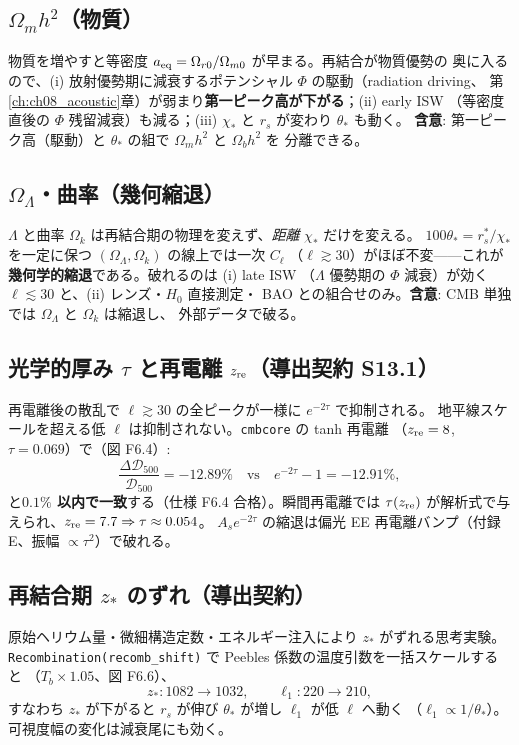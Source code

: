 \subsection{$\Omega_mh^2$（物質）}
物質を増やすと等密度 $a_{\rm eq}=\Omega_{r0}/\Omega_{m0}$ が早まる。再結合が物質優勢の
奥に入るので、(i) 放射優勢期に減衰するポテンシャル $\Phi$ の駆動（radiation driving、
第\ref{ch:ch08_acoustic}章）が弱まり\textbf{第一ピーク高が下がる}；(ii) early ISW
（等密度直後の $\Phi$ 残留減衰）も減る；(iii) $\chi_*$ と $r_s$ が変わり $\theta_*$ も動く。
\textbf{含意}: 第一ピーク高（駆動）と $\theta_*$ の組で $\Omega_mh^2$ と $\Omega_bh^2$ を
分離できる。

\subsection{$\Omega_\Lambda$・曲率（幾何縮退）}
$\Lambda$ と曲率 $\Omega_k$ は再結合期の物理を変えず、\emph{距離} $\chi_*$ だけを変える。
$100\theta_*=r_s^*/\chi_*$ を一定に保つ $(\Omega_\Lambda,\Omega_k)$ の線上では一次 $C_\ell$
（$\ell\gtrsim30$）がほぼ不変——これが\textbf{幾何学的縮退}である。破れるのは (i) late ISW
（$\Lambda$ 優勢期の $\Phi$ 減衰）が効く $\ell\lesssim30$ と、(ii) レンズ・$H_0$ 直接測定・
BAO との組合せのみ。\textbf{含意}: CMB 単独では $\Omega_\Lambda$ と $\Omega_k$ は縮退し、
外部データで破る。

\subsection{光学的厚み $\tau$ と再電離 $z_{\rm re}$（導出契約 S13.1）}
再電離後の散乱で $\ell\gtrsim30$ の全ピークが一様に $e^{-2\tau}$ で抑制される。
地平線スケールを超える低 $\ell$ は抑制されない。\texttt{cmbcore} の tanh 再電離
（$z_{\rm re}=8$, $\tau=0.069$）で（図 F6.4）:
\begin{equation}
  \frac{\Delta\mathcal D_{500}}{\mathcal D_{500}}=-12.89\%
  \quad\text{vs}\quad e^{-2\tau}-1=-12.91\%,
\end{equation}
と\textbf{$0.1\%$ 以内で一致}する（仕様 F6.4 合格）。瞬間再電離では
$\tau(z_{\rm re})$ が解析式で与えられ、$z_{\rm re}=7.7\Rightarrow\tau\approx0.054$。
$A_se^{-2\tau}$ の縮退は偏光 EE 再電離バンプ（付録E、振幅 $\propto\tau^2$）で破れる。

\subsection{再結合期 $z_*$ のずれ（導出契約）}
原始ヘリウム量・微細構造定数・エネルギー注入により $z_*$ がずれる思考実験。
\texttt{Recombination(recomb\_shift)} で Peebles 係数の温度引数を一括スケールすると
（$T_b\times1.05$、図 F6.6）、
\begin{equation}
  z_*:1082\to1032,\qquad \ell_1:220\to210,
\end{equation}
すなわち $z_*$ が下がると $r_s$ が伸び $\theta_*$ が増し $\ell_1$ が低 $\ell$ へ動く
（$\ell_1\propto1/\theta_*$）。可視度幅の変化は減衰尾にも効く。

